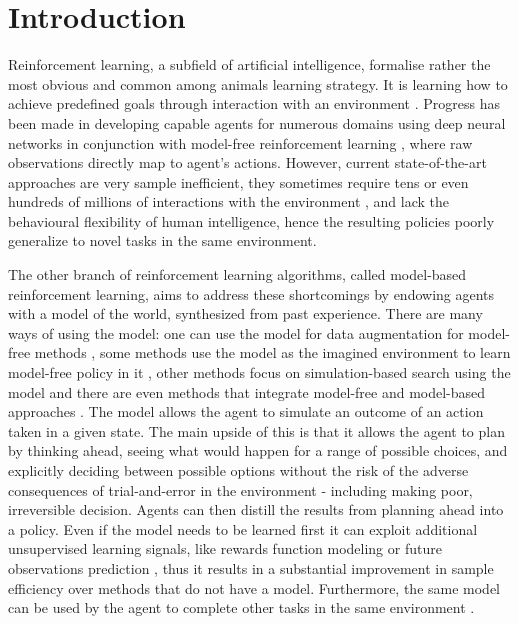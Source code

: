 \section{Introduction}

Reinforcement learning, a subfield of artificial intelligence, formalise rather the most obvious and common among animals learning strategy. It is learning how to achieve predefined goals through interaction with an environment \cite{Book.RLAI}. Progress has been made in developing capable agents for numerous domains using deep neural networks in conjunction with model-free reinforcement learning \cite{Algo.Rainbow}\cite{Algo.A3C}\cite{Algo.PPO}, where raw observations directly map to agent's actions. However, current state-of-the-art approaches are very sample inefficient, they sometimes require tens or even hundreds of millions of interactions with the environment \cite{Benchmark.RevisitingALE}, and lack the behavioural flexibility of human intelligence, hence the resulting policies poorly generalize to novel tasks in the same environment.

The other branch of reinforcement learning algorithms, called model-based reinforcement learning, aims to address these shortcomings by endowing agents with a model of the world, synthesized from past experience. There are many ways of using the model: one can use the model for data augmentation for model-free methods \cite{Algo.MBVE}, some methods use the model as the imagined environment to learn model-free policy in it \cite{Algo.WorldModels}, other methods focus on simulation-based search using the model \cite{Algo.AlphaZero} and there are even methods that integrate model-free and model-based approaches \cite{Algo.I2A}. The model allows the agent to simulate an outcome of an action taken in a given state. The main upside of this is that it allows the agent to plan by thinking ahead, seeing what would happen for a range of possible choices, and explicitly deciding between possible options without the risk of the adverse consequences of trial-and-error in the environment - including making poor, irreversible decision. Agents can then distill the results from planning ahead into a policy. Even if the model needs to be learned first it can exploit additional unsupervised learning signals, like rewards function modeling or future observations prediction \cite{Algo.AuxiliaryTasks}, thus it results in a substantial improvement in sample efficiency over methods that do not have a model. Furthermore, the same model can be used by the agent to complete other tasks in the same environment \cite{Algo.I2A}.

